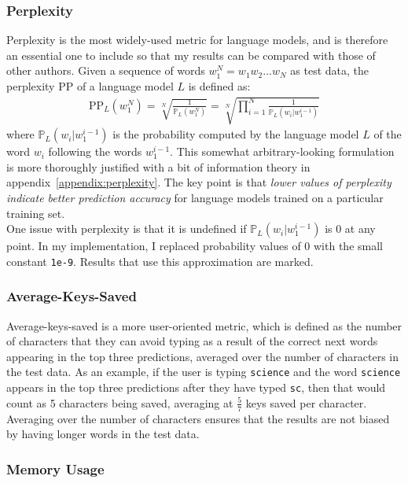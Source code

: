 \documentclass[a4paper, 12pt]{report}
\newcommand{\ttt}[1]{\texttt{#1}}
\newcommand{\tit}[1]{\textit{#1}}
\begin{document}
\subsubsection{Perplexity} \label{perplexity}

Perplexity is the most widely-used metric for language models, and is therefore an essential one to include so that my results can be compared with those of other authors. Given a sequence of words $w_1^{N} = w_1w_2...w_N$ as test data, the perplexity PP of a language model $L$ is defined as:
\begin{gather} \label{eq:perplexity}
	\text{PP}_L(w_1^N) = \sqrt[N]{\frac{1}{\mathbb{P}_L(w_1^N)}} = \sqrt[N]{\prod_{i=1}^{N}\frac{1}{\mathbb{P}_L(w_i | w_1^{i-1})}}
\end{gather}
where $\mathbb{P}_L(w_i | w_1^{i-1})$ is the probability computed by the language model $L$ of the word $w_i$ following the words $w_1^{i-1}$. This somewhat arbitrary-looking formulation is more thoroughly justified with a bit of information theory in appendix~\ref{appendix:perplexity}. The key point is that \tit{lower values of perplexity indicate better prediction accuracy} for language models trained on a particular training set. \\

One issue with perplexity is that it is undefined if $\mathbb{P}_L(w_i | w_1^{i-1})$ is 0 at any point. In my implementation, I replaced probability values of 0 with the small constant \ttt{1e-9}. Results that use this approximation are marked.

\subsubsection{Average-Keys-Saved}

Average-keys-saved is a more user-oriented metric, which is defined as the number of characters that they can avoid typing as a result of the correct next words appearing in the top three predictions, averaged over the number of characters in the test data. As an example, if the user is typing \ttt{science} and the word \ttt{science} appears in the top three predictions after they have typed \ttt{sc}, then that would count as 5 characters being saved, averaging at $\frac{5}{7}$ keys saved per character. Averaging over the number of characters ensures that the results are not biased by having longer words in the test data.

\subsubsection{Memory Usage}
\end{document}
